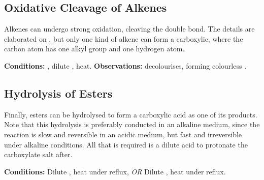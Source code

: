 


		\subsection{Oxidative Cleavage of Alkenes}

			Alkenes can undergo strong oxidation, cleaving the double bond. The details are elaborated on
			\hyperlink{OxidativeCleavageOfAlkenes}{}, but only one kind of alkene can form a carboxylic, where the carbon
			atom has one alkyl group and one hydrogen atom.

			\vspace{1.5em}
			\vbox{\textbf{Conditions:}	\tabto{35mm}, dilute , heat.}
			\vbox{\textbf{Observations:}  decolourises, forming colourless .}





		\pagebreak
		\subsection{Hydrolysis of Esters}

			Finally, esters can be hydrolysed to form a carboxylic acid as one of its products. Note that this hydrolysis is preferably
			conducted in an alkaline medium, since the reaction is slow and reversible in an acidic medium, but fast and irreversible under
			alkaline conditions. All that is required is a dilute acid to protonate the carboxylate salt after.

			\vspace{1.5em}
			\vbox{\textbf{Conditions:}	\tabto{35mm}Dilute , heat under reflux, \textit{OR}
										\tabto{35mm}Dilute , heat under reflux.}

